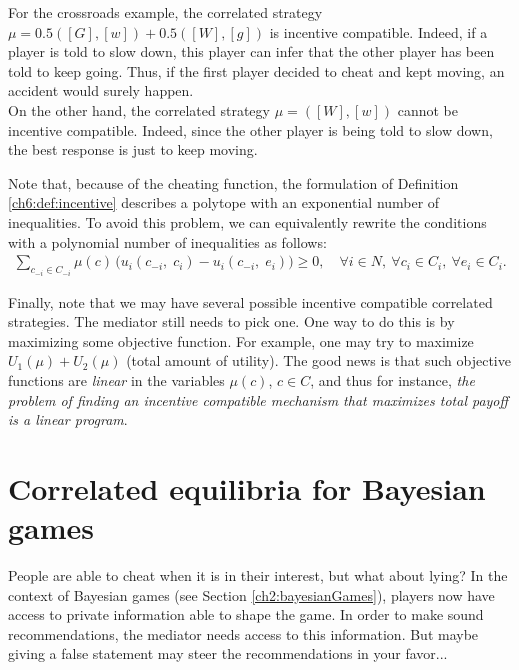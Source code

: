 \begin{example}
For the crossroads example, the correlated strategy $\mu = 0.5([G], [w]) + 0.5 ([W],[g])$ is incentive compatible.
Indeed, if a player is told to slow down, this player can infer that the other player has been told to keep going. Thus, if the first player decided to cheat and kept moving, an accident would surely happen.\\
On the other hand, the correlated strategy $\mu = ([W],[w])$ cannot be incentive compatible. Indeed, since the other player is being told to slow down, the best response is just to keep moving.
\end{example}

 Note that, because of the cheating function, the  formulation of Definition \ref{ch6:def:incentive} describes a polytope with an exponential number of inequalities. To avoid this problem, we can equivalently rewrite the conditions with a polynomial number of inequalities as follows:
\begin{align*}
	\sum_{c_{-i} \in C_{-i}} \mu(c) \, \big( u_i(c_{-i}, \; c_i) - u_i(c_{-i}, \; e_i) \big) \geq 0, \quad \forall i \in N, \ \forall c_i \in C_i, \ \forall e_i \in C_i.
\end{align*}

Finally, note that we may have several possible incentive compatible correlated strategies. The mediator still needs to pick one.
One way to do this is by maximizing some objective function. For example,
one may try to maximize $U_1(\mu) + U_2(\mu)$ (total amount of utility). The good news is that such objective functions are \emph{linear} in the variables $\mu(c)$, $c \in C$, and thus for instance, \emph{the problem of finding an incentive compatible mechanism that maximizes total payoff is a linear program}.

\section{Correlated equilibria for Bayesian games}
\label{ch5:sec:bay}




People are able to cheat when it is in their interest, but what about lying? In the context of Bayesian games (see Section \ref{ch2:bayesianGames}), players now have access to private information
able to shape the game. In order to make sound recommendations, the mediator needs access to this information. But maybe giving a false statement may steer the recommendations in your favor...

